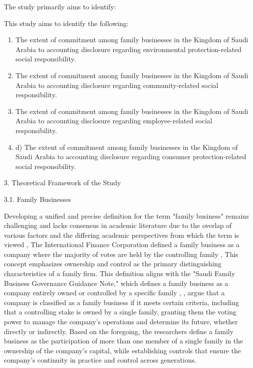 \documentclass[10pt]{NSP1}
\begin{document}
The study primarily aims to identify:

This study aims to identify the following:

\begin{enumerate}
  \item The extent of commitment among family businesses in the Kingdom of Saudi Arabia to accounting disclosure regarding environmental protection-related social responsibility.
  \item The extent of commitment among family businesses in the Kingdom of Saudi Arabia to accounting disclosure regarding community-related social responsibility.
  \item The extent of commitment among family businesses in the Kingdom of Saudi Arabia to accounting disclosure regarding employee-related social responsibility.
  \item d) The extent of commitment among family businesses in the Kingdom of Saudi Arabia to accounting disclosure regarding consumer protection-related social responsibility.
\end{enumerate}

3. Theoretical Framework of the Study

3.1. Family Businesses

Developing a unified and precise definition for the term "family business" remains challenging and lacks consensus in academic literature due to the overlap of various factors and the differing academic perspectives from which the term is viewed \cite{ref12}, The International Finance Corporation defined a family business as a company where the majority of votes are held by the controlling family \cite{ref38}, This concept emphasizes ownership and control as the primary distinguishing characteristics of a family firm. This definition aligns with the "Saudi Family Business Governance Guidance Note," which defines a family business as a company entirely owned or controlled by a specific family \cite{ref11}, \cite{ref13}, argue that a company is classified as a family business if it meets certain criteria, including that a controlling stake is owned by a single family, granting them the voting power to manage the company's operations and determine its future, whether directly or indirectly. Based on the foregoing, the researchers define a family business as the participation of more than one member of a single family in the ownership of the company's capital, while establishing controls that ensure the company's continuity in practice and control across generations.
\end{document}
